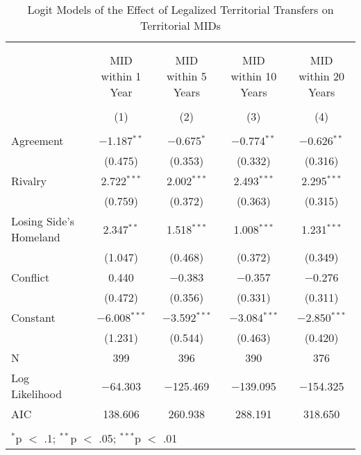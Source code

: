 \documentclass{article}
\begin{document}
\begin{table}[!htbp] \centering 
  \caption{Logit Models of the Effect of Legalized Territorial Transfers on Territorial MIDs} 
  \label{} 
\begin{tabular}{@{\extracolsep{5pt}}lcccc} 
\\[-1.8ex]\hline \\[-1.8ex] 
\\[-1.8ex] & MID within 1 Year & MID within 5 Years & MID within 10 Years & MID within 20 Years \\ 
\\[-1.8ex] & (1) & (2) & (3) & (4)\\ 
\hline \\[-1.8ex] 
 Agreement & $-$1.187$^{**}$ & $-$0.675$^{*}$ & $-$0.774$^{**}$ & $-$0.626$^{**}$ \\ 
  & (0.475) & (0.353) & (0.332) & (0.316) \\ 
  Rivalry & 2.722$^{***}$ & 2.002$^{***}$ & 2.493$^{***}$ & 2.295$^{***}$ \\ 
  & (0.759) & (0.372) & (0.363) & (0.315) \\ 
  Losing Side's Homeland & 2.347$^{**}$ & 1.518$^{***}$ & 1.008$^{***}$ & 1.231$^{***}$ \\ 
  & (1.047) & (0.468) & (0.372) & (0.349) \\ 
  Conflict & 0.440 & $-$0.383 & $-$0.357 & $-$0.276 \\ 
  & (0.472) & (0.356) & (0.331) & (0.311) \\ 
  Constant & $-$6.008$^{***}$ & $-$3.592$^{***}$ & $-$3.084$^{***}$ & $-$2.850$^{***}$ \\ 
  & (1.231) & (0.544) & (0.463) & (0.420) \\ 
 N & 399 & 396 & 390 & 376 \\ 
Log Likelihood & $-$64.303 & $-$125.469 & $-$139.095 & $-$154.325 \\ 
AIC & 138.606 & 260.938 & 288.191 & 318.650 \\ 
\hline \\[-1.8ex] 
\multicolumn{5}{l}{$^{*}$p $<$ .1; $^{**}$p $<$ .05; $^{***}$p $<$ .01} \\ 
\end{tabular} 
\end{table}
\end{document}
